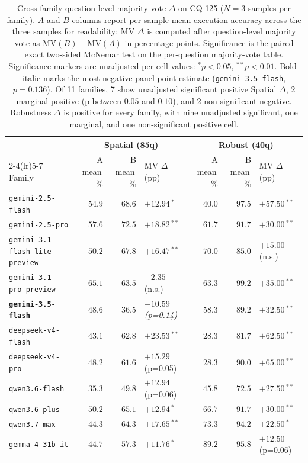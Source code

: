 \begin{table}[h]
\centering
\scriptsize
\setlength{\tabcolsep}{3.5pt}
\begin{tabular}{lrrlrrl}
\toprule
 & \multicolumn{3}{c}{Spatial (85q)} & \multicolumn{3}{c}{Robust (40q)} \\
\cmidrule(lr){2-4}\cmidrule(lr){5-7}
Family & A mean\,\% & B mean\,\% & MV $\Delta$ (pp) & A mean\,\% & B mean\,\% & MV $\Delta$ (pp) \\
\midrule
\texttt{gemini-2.5-flash} & $54.9$ & $68.6$ & $+12.94$\,$^{*}$ & $40.0$ & $97.5$ & $+57.50$\,$^{**}$ \\
\texttt{gemini-2.5-pro} & $57.6$ & $72.5$ & $+18.82$\,$^{**}$ & $61.7$ & $91.7$ & $+30.00$\,$^{**}$ \\
\texttt{gemini-3.1-flash-lite-preview} & $50.2$ & $67.8$ & $+16.47$\,$^{**}$ & $70.0$ & $85.0$ & $+15.00$ (n.s.) \\
\texttt{gemini-3.1-pro-preview} & $65.1$ & $63.5$ & $-2.35$ (n.s.) & $63.3$ & $99.2$ & $+35.00$\,$^{**}$ \\
\textbf{\texttt{gemini-3.5-flash}} & $48.6$ & $36.5$ & $\mathbf{-10.59}$ \emph{(p=0.14)} & $58.3$ & $89.2$ & $+32.50$\,$^{**}$ \\
\texttt{deepseek-v4-flash} & $43.1$ & $62.8$ & $+23.53$\,$^{**}$ & $28.3$ & $81.7$ & $+62.50$\,$^{**}$ \\
\texttt{deepseek-v4-pro} & $48.2$ & $61.6$ & $+15.29$ (p=0.05) & $28.3$ & $90.0$ & $+65.00$\,$^{**}$ \\
\texttt{qwen3.6-flash} & $35.3$ & $49.8$ & $+12.94$ (p=0.06) & $45.8$ & $72.5$ & $+27.50$\,$^{**}$ \\
\texttt{qwen3.6-plus} & $50.2$ & $65.1$ & $+12.94$\,$^{*}$ & $66.7$ & $91.7$ & $+30.00$\,$^{**}$ \\
\texttt{qwen3.7-max} & $44.3$ & $64.3$ & $+17.65$\,$^{**}$ & $73.3$ & $94.2$ & $+22.50$\,$^{*}$ \\
\texttt{gemma-4-31b-it} & $44.7$ & $57.3$ & $+11.76$\,$^{*}$ & $89.2$ & $95.8$ & $+12.50$ (p=0.06) \\
\bottomrule
\end{tabular}
\caption{Cross-family question-level majority-vote $\Delta$ on CQ-125 ($N{=}3$ samples per family). $A$ and $B$ columns report per-sample mean execution accuracy across the three samples for readability; MV $\Delta$ is computed after question-level majority vote as $\text{MV}(B)-\text{MV}(A)$ in percentage points. Significance is the paired exact two-sided McNemar test on the per-question majority-vote table. Significance markers are unadjusted per-cell values: $^{*}p{<}0.05$, $^{**}p{<}0.01$. Bold-italic marks the most negative panel point estimate (\texttt{gemini-3.5-flash}, $p{=}0.136$). Of 11 families, 7 show unadjusted significant positive Spatial $\Delta$, 2 marginal positive (p between $0.05$ and $0.10$), and 2 non-significant negative. Robustness $\Delta$ is positive for every family, with nine unadjusted significant, one marginal, and one non-significant positive cell.}
\label{tab:gisr:cross-family}
\end{table}

